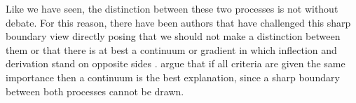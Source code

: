 \documentclass[12pt]{article}
\begin{document}
Like we have seen, the distinction between these two processes is not without debate. For this reason, there have been authors that have challenged this sharp boundary view directly posing that we should not make a distinction between them \parencite{haspelmath2024InflectionDerivationTraditional} or that there is at best a continuum or gradient in which inflection and derivation stand on opposite sides \parencite{bybee1985MorphologyStudyRelation, stekauer2015DelimitationDerivationInflection}. \textcite{haspelmath2013UnderstandingMorphology} argue that if all criteria are given the same importance then a continuum is the best explanation, since a sharp boundary between both processes cannot be drawn. 

\end{document}
